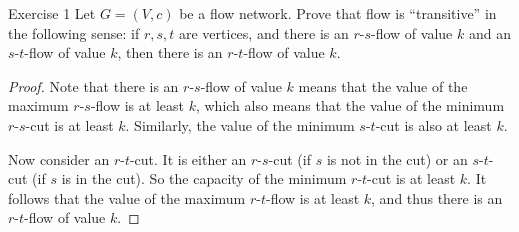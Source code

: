 



    \begin{thm}{Exercise 1}{}
        Let $G = (V, c)$ be a flow network. Prove that flow is ``transitive'' in the following sense: if $r, s, t$ are vertices, and there is an $r$-$s$-flow of value $k$ and an $s$-$t$-flow of value $k$, then there is an $r$-$t$-flow of value $k$.
    \end{thm}

    \begin{proof}
        Note that there is an $r$-$s$-flow of value $k$ means that the value of the maximum $r$-$s$-flow is at least $k$, which also means that the value of the minimum $r$-$s$-cut is at least $k$. Similarly, the value of the minimum $s$-$t$-cut is also at least $k$.
        
        Now consider an $r$-$t$-cut. It is either an $r$-$s$-cut (if $s$ is not in the cut) or an $s$-$t$-cut (if $s$ is in the cut). So the capacity of the minimum $r$-$t$-cut is at least $k$. It follows that the value of the maximum $r$-$t$-flow is at least $k$, and thus there is an $r$-$t$-flow of value $k$.
    \end{proof}

